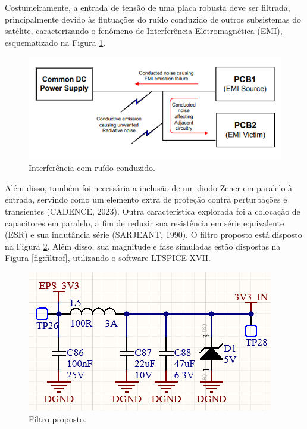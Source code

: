Costumeiramente, a entrada de tensão de uma placa robusta deve ser filtrada, principalmente devido às flutuações do ruído conduzido de outros subsistemas do satélite, caracterizando o fenômeno de Interferência Eletromagnética (EMI), esquematizado na Figura \ref{fig:emi}.

\begin{figure}[H]
    \centering
    \includegraphics[scale=1]{images/EMI noise.png}
    \caption{Interferência com ruído conduzido.}
    \label{fig:emi}
\end{figure}

Além disso, também foi necessária a inclusão de um diodo Zener em paralelo à entrada, servindo como um elemento extra de proteção contra perturbações e transientes (CADENCE, 2023). Outra característica explorada foi a colocação de capacitores em paralelo, a fim de reduzir sua resistência em série equivalente (ESR) e sua indutância série (SARJEANT, 1990).  O filtro proposto está disposto na Figura \ref{fig:FILTRO}.  Além disso, sua magnitude e fase simuladas estão dispostas na Figura \ref{fig:filtrof}, utilizando o software LTSPICE XVII.

\begin{figure}[H]
    \centering
    \includegraphics[scale=1]{images/FILTRO.png}
    \caption{Filtro proposto.}
    \label{fig:FILTRO}
\end{figure}


